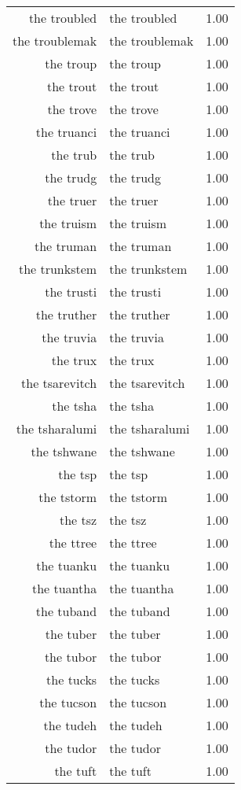 \begin{table}[ht]
\begin{tabular}{rlr}
  the troubled & the troubled & 1.00 \\ 
  the troublemak & the troublemak & 1.00 \\ 
  the troup & the troup & 1.00 \\ 
  the trout & the trout & 1.00 \\ 
  the trove & the trove & 1.00 \\ 
  the truanci & the truanci & 1.00 \\ 
  the trub & the trub & 1.00 \\ 
  the trudg & the trudg & 1.00 \\ 
  the truer & the truer & 1.00 \\ 
  the truism & the truism & 1.00 \\ 
  the truman & the truman & 1.00 \\ 
  the trunkstem & the trunkstem & 1.00 \\ 
  the trusti & the trusti & 1.00 \\ 
  the truther & the truther & 1.00 \\ 
  the truvia & the truvia & 1.00 \\ 
  the trux & the trux & 1.00 \\ 
  the tsarevitch & the tsarevitch & 1.00 \\ 
  the tsha & the tsha & 1.00 \\ 
  the tsharalumi & the tsharalumi & 1.00 \\ 
  the tshwane & the tshwane & 1.00 \\ 
  the tsp & the tsp & 1.00 \\ 
  the tstorm & the tstorm & 1.00 \\ 
  the tsz & the tsz & 1.00 \\ 
  the ttree & the ttree & 1.00 \\ 
  the tuanku & the tuanku & 1.00 \\ 
  the tuantha & the tuantha & 1.00 \\ 
  the tuband & the tuband & 1.00 \\ 
  the tuber & the tuber & 1.00 \\ 
  the tubor & the tubor & 1.00 \\ 
  the tucks & the tucks & 1.00 \\ 
  the tucson & the tucson & 1.00 \\ 
  the tudeh & the tudeh & 1.00 \\ 
  the tudor & the tudor & 1.00 \\ 
  the tuft & the tuft & 1.00 \\ 

\end{tabular}
\end{table}

